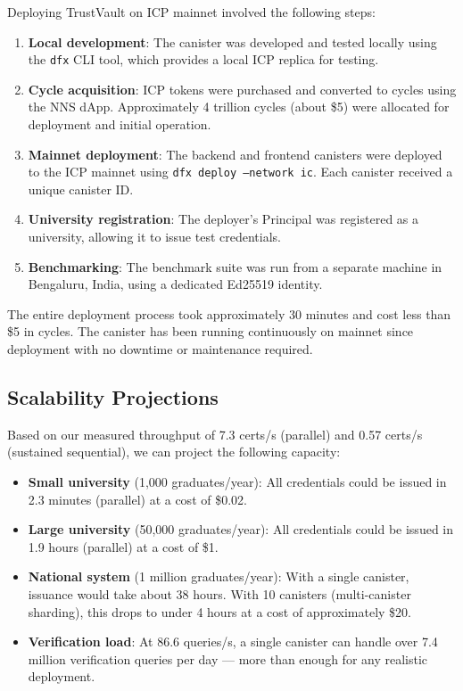 \documentclass[journal]{IEEEtran}
\begin{document}
Deploying TrustVault on ICP mainnet involved the following steps:

\begin{enumerate}
  \item \textbf{Local development}: The canister was developed and tested locally using the \texttt{dfx} CLI tool, which provides a local ICP replica for testing.
  \item \textbf{Cycle acquisition}: ICP tokens were purchased and converted to cycles using the NNS dApp. Approximately 4 trillion cycles (about \$5) were allocated for deployment and initial operation.
  \item \textbf{Mainnet deployment}: The backend and frontend canisters were deployed to the ICP mainnet using \texttt{dfx deploy --network ic}. Each canister received a unique canister ID.
  \item \textbf{University registration}: The deployer's Principal was registered as a university, allowing it to issue test credentials.
  \item \textbf{Benchmarking}: The benchmark suite was run from a separate machine in Bengaluru, India, using a dedicated Ed25519 identity.
\end{enumerate}

The entire deployment process took approximately 30 minutes and cost less than \$5 in cycles. The canister has been running continuously on mainnet since deployment with no downtime or maintenance required.

\subsection{Scalability Projections}

Based on our measured throughput of 7.3 certs/s (parallel) and 0.57 certs/s (sustained sequential), we can project the following capacity:

\begin{itemize}[leftmargin=*]
  \item \textbf{Small university} (1,000 graduates/year): All credentials could be issued in 2.3 minutes (parallel) at a cost of \$0.02.
  \item \textbf{Large university} (50,000 graduates/year): All credentials could be issued in 1.9 hours (parallel) at a cost of \$1.
  \item \textbf{National system} (1 million graduates/year): With a single canister, issuance would take about 38 hours. With 10 canisters (multi-canister sharding), this drops to under 4 hours at a cost of approximately \$20.
  \item \textbf{Verification load}: At 86.6 queries/s, a single canister can handle over 7.4 million verification queries per day — more than enough for any realistic deployment.
\end{itemize}
\end{document}
